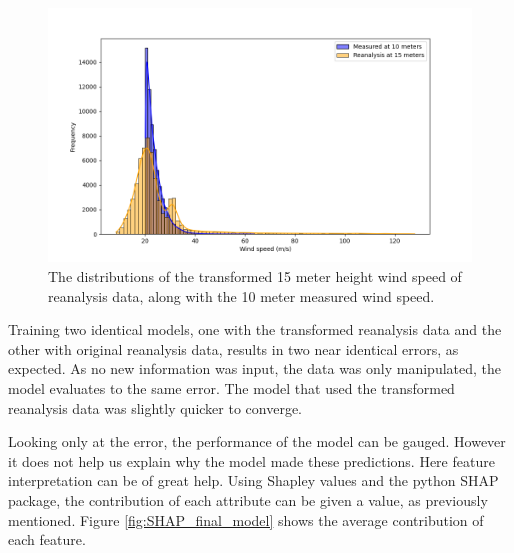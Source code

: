 \begin{figure}
    \centering
    \includegraphics[scale = 0.5]{Figures/transformed_reanalysis_measured.png}
    \caption[Transformed reanalysis wind speed and measured wind speed.]{The distributions of the transformed 15 meter height wind speed of reanalysis data, along with the 10 meter measured wind speed.}
    \label{fig:transformed_reanalysis_measured}
\end{figure}

Training two identical models, one with the transformed reanalysis data and the other with original reanalysis data, results in two near identical errors, as expected. As no new information was input, the data was only manipulated, the model evaluates to the same error. The model that used the transformed reanalysis data was slightly quicker to converge.

Looking only at the error, the performance of the model can be gauged. However it does not help us explain why the model made these predictions. Here feature interpretation can be of great help. Using Shapley values and the python SHAP package, the contribution of each attribute can be given a value, as previously mentioned. Figure \ref{fig:SHAP_final_model} shows the average contribution of each feature.
